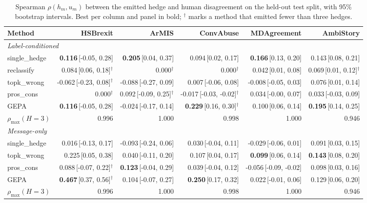\begin{table}[t]
\centering
\small
\begin{tabular}{lrrrrr}
\hline
Method & HSBrexit & ArMIS & ConvAbuse & MDAgreement & AmbiStory \\
\hline
\multicolumn{6}{l}{\emph{Label-conditioned}} \\
single\_hedge & \textbf{0.116}{\scriptsize\,[-0.05, 0.28]} & \textbf{0.205}{\scriptsize\,[0.04, 0.37]} & 0.094{\scriptsize\,[0.02, 0.17]} & \textbf{0.166}{\scriptsize\,[0.13, 0.20]} & 0.143{\scriptsize\,[0.08, 0.21]} \\
reclassify & 0.084{\scriptsize\,[0.06, 0.18]}$^\dagger$ & 0.000$^\dagger$ & 0.000$^\dagger$ & 0.042{\scriptsize\,[0.01, 0.08]} & 0.069{\scriptsize\,[0.01, 0.12]}$^\dagger$ \\
topk\_wrong & -0.062{\scriptsize\,[-0.23, 0.08]}$^\dagger$ & -0.088{\scriptsize\,[-0.27, 0.09]} & 0.007{\scriptsize\,[-0.06, 0.08]} & -0.008{\scriptsize\,[-0.05, 0.03]} & 0.076{\scriptsize\,[0.01, 0.14]} \\
pros\_cons & 0.000$^\dagger$ & 0.092{\scriptsize\,[-0.09, 0.25]}$^\dagger$ & -0.017{\scriptsize\,[-0.03, -0.02]}$^\dagger$ & 0.034{\scriptsize\,[-0.00, 0.07]} & 0.033{\scriptsize\,[-0.03, 0.09]} \\
GEPA & \textbf{0.116}{\scriptsize\,[-0.05, 0.28]} & -0.024{\scriptsize\,[-0.17, 0.14]} & \textbf{0.229}{\scriptsize\,[0.16, 0.30]}$^\dagger$ & 0.100{\scriptsize\,[0.06, 0.14]} & \textbf{0.195}{\scriptsize\,[0.14, 0.25]} \\
$\rho_{\max}(H{=}3)$ & 0.996 & 1.000 & 0.998 & 1.000 & 0.946 \\
\hline
\multicolumn{6}{l}{\emph{Message-only}} \\
single\_hedge & 0.016{\scriptsize\,[-0.13, 0.17]} & -0.093{\scriptsize\,[-0.24, 0.06]} & 0.030{\scriptsize\,[-0.04, 0.11]} & -0.029{\scriptsize\,[-0.06, 0.01]} & 0.091{\scriptsize\,[0.03, 0.15]} \\
topk\_wrong & 0.225{\scriptsize\,[0.05, 0.38]} & 0.040{\scriptsize\,[-0.11, 0.20]} & 0.107{\scriptsize\,[0.04, 0.17]} & \textbf{0.099}{\scriptsize\,[0.06, 0.14]} & \textbf{0.143}{\scriptsize\,[0.08, 0.20]} \\
pros\_cons & 0.088{\scriptsize\,[-0.07, 0.22]}$^\dagger$ & \textbf{0.123}{\scriptsize\,[-0.04, 0.29]} & 0.039{\scriptsize\,[-0.04, 0.12]} & -0.056{\scriptsize\,[-0.09, -0.02]} & 0.098{\scriptsize\,[0.03, 0.16]} \\
GEPA & \textbf{0.467}{\scriptsize\,[0.37, 0.56]}$^\dagger$ & 0.104{\scriptsize\,[-0.07, 0.27]} & \textbf{0.250}{\scriptsize\,[0.17, 0.32]} & 0.022{\scriptsize\,[-0.01, 0.06]} & 0.129{\scriptsize\,[0.06, 0.20]} \\
$\rho_{\max}(H{=}3)$ & 0.996 & 1.000 & 0.998 & 1.000 & 0.946 \\
\hline
\end{tabular}
\caption{Spearman $\rho(h_m,u_m)$ between the emitted hedge and human disagreement on the held-out test split, with 95\% bootstrap intervals. Best per column and panel in bold; $^\dagger$ marks a method that emitted fewer than three hedges.}
\label{tab:main}
\end{table}